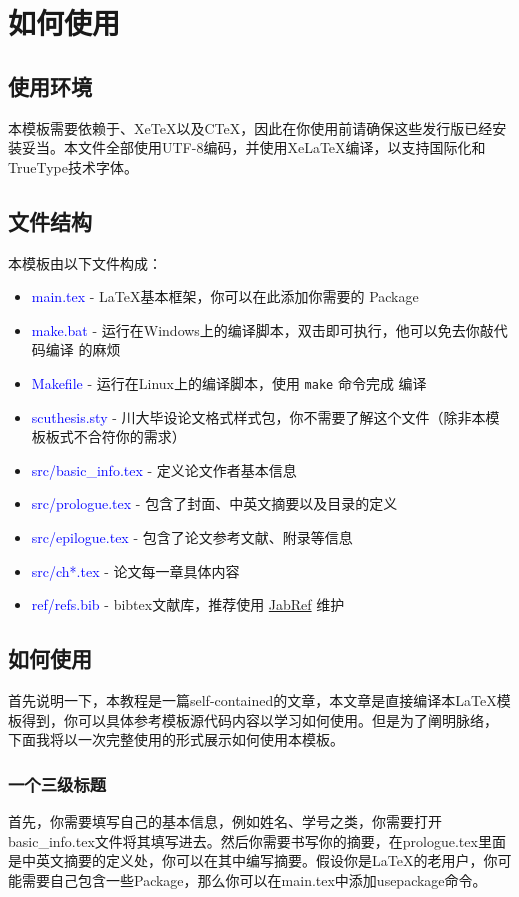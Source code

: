 \chapter{如何使用}
\section{使用环境}
本模板需要依赖于\LaTeXe 、Xe\TeX 以及C\TeX ，因此在你使用前请确保这些发行版已经安装妥当。本文件全部使用UTF-8编码，并使用Xe\LaTeX 编译，以支持国际化和TrueType技术字体。

\section{文件结构}
本模板由以下文件构成：
\begin{itemize}
\item \textcolor{blue}{main.tex} - \LaTeX 基本框架，你可以在此添加你需要的
  Package
\item \textcolor{blue}{make.bat} - 运行在Windows上的编译脚本，双击即可执行，他可以免去你敲代码编译
  的麻烦 \smiley
\item \textcolor{blue}{Makefile} - 运行在Linux上的编译脚本，使用 \verb|make| 命令完成
  编译
\item \textcolor{blue}{scuthesis.sty} - 川大毕设论文格式样式包，你不需要了解这个文件（除非本模板板式不合符你的需求）
\item \textcolor{blue}{src/basic\_info.tex} - 定义论文作者基本信息
\item \textcolor{blue}{src/prologue.tex} - 包含了封面、中英文摘要以及目录的定义
\item \textcolor{blue}{src/epilogue.tex} - 包含了论文参考文献、附录等信息
\item \textcolor{blue}{src/ch*.tex} - 论文每一章具体内容
\item \textcolor{blue}{ref/refs.bib} - bibtex文献库，推荐使用 \href{http://jabref.sourceforge.net/}{JabRef} 维护
\end{itemize}

\section{如何使用}
首先说明一下，本教程是一篇self-contained的文章，本文章是直接编译本\LaTeX 模板得到，你可以具体参考模板源代码内容以学习如何使用。但是为了阐明脉络， 下面我将以一次完整使用的形式展示如何使用本模板。
\subsection{一个三级标题}
首先，你需要填写自己的基本信息，例如姓名、学号之类，你需要打开basic\_info.tex文件将其填写进去。然后你需要书写你的摘要，在prologue.tex里面是中英文摘要的定义处，你可以在其中编写摘要。假设你是\LaTeX 的老用户，你可能需要自己包含一些Package，那么你可以在main.tex中添加usepackage命令。
